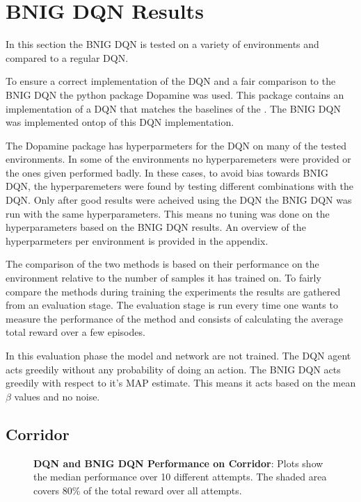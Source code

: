 \section{BNIG DQN Results}

In this section the BNIG DQN is tested on a variety of environments and compared to a regular DQN.

To ensure a correct implementation of the DQN and a fair comparison to the BNIG DQN the python package Dopamine\citep{castro_18} was used. This package contains an implementation of a DQN that matches the baselines of the \cite{mnih_2015}. The BNIG DQN was implemented ontop of this DQN implementation.

The Dopamine package has hyperparmeters for the DQN on many of the tested environments. In some of the environments no hyperparemeters were provided or the ones given performed badly. In these cases, to avoid bias towards BNIG DQN, the hyperparemeters were found by testing different combinations with the DQN. Only after good results were acheived using the DQN the BNIG DQN was run with the same hyperparameters. This means no tuning was done on the hyperparameters based on the BNIG DQN results. An overview of the hyperparmeters per environment is provided in the appendix.

The comparison of the two methods is based on their performance on the environment relative to the number of samples it has trained on. To fairly compare the methods during training the experiments the results are gathered from an evaluation stage. The evaluation stage is run every time one wants to measure the performance of the method and consists of calculating the average total reward over a few episodes.

In this evaluation phase the model and network are not trained. The DQN agent acts greedily without any probability of doing an action. The BNIG DQN acts greedily with respect to it's MAP estimate. This means it acts based on the mean $\beta$ values and no noise.

\subsection{Corridor}

\begin{figure}[H]
    \centering
    \caption{\textbf{DQN and BNIG DQN Performance on Corridor}: Plots show the median performance over 10 different attempts. The shaded area covers 80\% of the total reward over all attempts.}
    \label{fig:nn_cartpole}
\end{figure}
